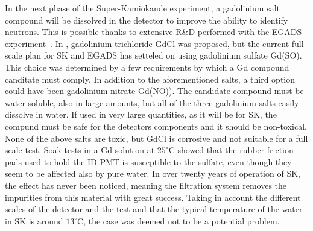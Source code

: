 In the next phase of the Super-Kamiokande experiment, a gadolinium salt compound %
will be dissolved in the detector to improve the ability to identify neutrons.
This is possible thanks to extensive R\&D performed with the EGADS experiment~\cite{Ikeda:2019pcm}.
In , gadolinium trichloride GdCl was proposed, %
but the current full-scale plan for SK and EGADS has setteled on using gadolinium sulfate Gd(SO).
This choice was determined by a few requirements by which a Gd compound canditate must comply.
In addition to the aforementioned salts, a third option could have been gadolinium nitrate Gd(NO)).
The candidate compound must be water soluble, also in large amounts, but all of the three gadolinium salts %
easily dissolve in water.
If used in very large quantities, as it will be for SK, the compund must be safe for %
the detectors components and it should be non-toxical. %
None of the above salts are toxic, but GdCl is corrosive and not suitable for a full scale test.
Soak tests in a Gd solution at $25^\circ$C showed that the rubber friction pads used to hold the ID PMT %
is susceptible to the sulfate, even though they seem to be affected also by pure water.
In over twenty years of operation of SK, the effect has never been noticed, meaning the filtration system %
removes the impurities from this material with great success.
Taking in account the different scales of the detector and the test and that the typical temperature %
of the water in SK is around $13^\circ$C, the case was deemed not to be a potential problem.
